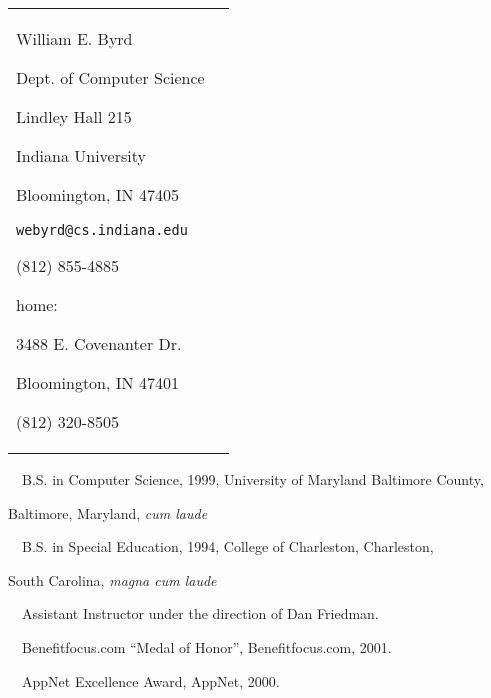 \begin{tabular}{l l}
\hspace{-0.92cm}
\begin{minipage}{2.5in}
\thispagestyle{empty}
William E. Byrd

Dept. of Computer Science

Lindley Hall 215

Indiana University

Bloomington, IN 47405

{\tt webyrd@cs.indiana.edu}

(812) 855-4885

\end{minipage}
\hspace{2cm}
\begin{minipage}{2.5in}
\vspace{-1.35cm}
home:

3488 E. Covenanter Dr.

Bloomington, IN 47401

(812) 320-8505
\end{minipage}
\end{tabular}

\bigskip


\medskip

\noindent \ \ B.S. in Computer Science, 1999, University of Maryland Baltimore County,  

\noindent \hspace{1cm} Baltimore, Maryland, {\it cum laude}

\medskip

\noindent \ \ B.S. in Special Education, 1994, College of Charleston, Charleston, 

\noindent \hspace{1cm} South Carolina, {\it magna cum laude}

\bigskip


\medskip

\noindent \ \ Assistant Instructor under the direction of Dan Friedman.

\bigskip


\medskip

\noindent \ \ Benefitfocus.com ``Medal of Honor'', Benefitfocus.com, 2001.

\medskip

\noindent \ \ AppNet Excellence Award, AppNet, 2000.

